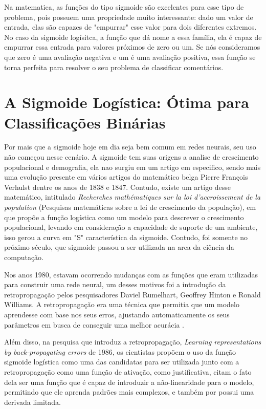 Na matematica, as funções do tipo sigmoide são excelentes para esse tipo de problema, pois possuem uma propriedade muito interessante: dado um valor de entrada, elas são capazes de "empurrar" esse valor para dois diferentes extremos. No caso da sigmoide logísitca, a função que dá nome a essa família, ela é capaz de empurrar essa entrada para valores próximos de zero ou um. Se nós consideramos que zero é uma avaliação negativa e um é uma avaliação positiva, essa função se torna perfeita para resolver o seu problema de classificar comentários.

\section{A Sigmoide Logística: Ótima para Classificações Binárias} 

Por mais que a sigmoide hoje em dia seja bem comum em redes neurais, seu uso não começou nesse cenário. A sigmoide tem suas origens a analise de crescimento populacional e demografia, ela nao surgiu em um artigo em especifico, sendo mais uma evolução presente em vários artigos do matemático belga Pierre François Verhulst dentre os anos de 1838 e 1847. Contudo, existe um artigo desse matemático, intitulado \textit{Recherches mathématiques sur la loi d'accroissement de la population} (Pesquisas matemáticas sobre a lei de crescimento da população), em que \textcite{SigmoidVerhulst1845} propõe a função logística como um modelo para descrever o crescimento populacional, levando em consideração a capacidade de suporte de um ambiente, isso gerou a curva em "S" característica da sigmoide. Contudo, foi somente no próximo século, que sigmoide passou a ser utilizada na area da ciência da computação.

Nos anos 1980, estavam ocorrendo mudanças com as funções que eram utilizadas para construir uma rede neural, um desses motivos foi a introdução da retropropagação pelos pesquisadores Daviel Rumelhart, Geoffrey Hinton e Ronald Williams. A retropropagação era uma técnica que permitia que um modelo aprendesse com base nos seus erros, ajustando automaticamente os seus parâmetros em busca de conseguir uma melhor acurácia \parencite{BackpropagationArticle}. 

Além disso, na pesquisa que introduz a retropropagação, \textit{Learning representations by back-propagating errors} de 1986, os cientistas propõem o uso da função sigmoide logística como uma das candidatas para ser utilizada junto com a retropropagação como uma função de ativação, como justificativa, \textcite{BackpropagationArticle} citam o fato dela ser uma função que é capaz de introduzir a não-linearidade para o modelo, permitindo que ele aprenda padrões mais complexos, e também por possui uma derivada limitada.

